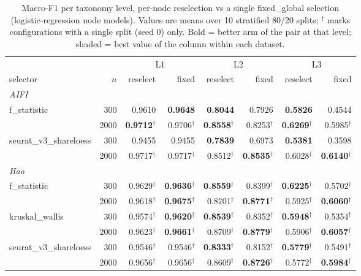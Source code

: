 \begin{table}[t]
\centering
\small
\setlength{\tabcolsep}{4pt}
\begin{tabular}{lrrrrrrr}
\toprule
 & & \multicolumn{2}{c}{L1} & \multicolumn{2}{c}{L2} & \multicolumn{2}{c}{L3} \\
\cmidrule(lr){3-4}\cmidrule(lr){5-6}\cmidrule(lr){7-8}
selector & $n$ & reselect & fixed & reselect & fixed & reselect & fixed \\
\midrule
\multicolumn{8}{l}{\textit{AIFI}} \\
f\_statistic & 300 & 0.9610 & \textbf{0.9648} & \textbf{0.8044} & 0.7926 & \textbf{0.5826} & 0.4544 \\
 & 2000 & \textbf{0.9712$^\dagger$} & 0.9706$^\dagger$ & \cellcolor{palegreen}\textbf{0.8558$^\dagger$} & 0.8253$^\dagger$ & \cellcolor{palegreen}\textbf{0.6269$^\dagger$} & 0.5985$^\dagger$ \\
\addlinespace
seurat\_v3\_shareloess & 300 & 0.9455 & 0.9455 & \textbf{0.7839} & 0.6973 & \textbf{0.5381} & 0.3598 \\
 & 2000 & \cellcolor{palegreen}0.9717$^\dagger$ & \cellcolor{palegreen}0.9717$^\dagger$ & 0.8512$^\dagger$ & \cellcolor{palegreen}\textbf{0.8535$^\dagger$} & 0.6028$^\dagger$ & \cellcolor{palegreen}\textbf{0.6140$^\dagger$} \\
\midrule
\multicolumn{8}{l}{\textit{Hao}} \\
f\_statistic & 300 & 0.9629$^\dagger$ & \textbf{0.9636$^\dagger$} & \textbf{0.8559$^\dagger$} & 0.8399$^\dagger$ & \cellcolor{palegreen}\textbf{0.6225$^\dagger$} & 0.5702$^\dagger$ \\
 & 2000 & 0.9618$^\dagger$ & \cellcolor{palegreen}\textbf{0.9675$^\dagger$} & 0.8701$^\dagger$ & \textbf{0.8771$^\dagger$} & 0.5925$^\dagger$ & \cellcolor{palegreen}\textbf{0.6060$^\dagger$} \\
\addlinespace
kruskal\_wallis & 300 & 0.9574$^\dagger$ & \textbf{0.9620$^\dagger$} & \textbf{0.8539$^\dagger$} & 0.8352$^\dagger$ & \textbf{0.5948$^\dagger$} & 0.5354$^\dagger$ \\
 & 2000 & 0.9623$^\dagger$ & \textbf{0.9661$^\dagger$} & \cellcolor{palegreen}0.8709$^\dagger$ & \cellcolor{palegreen}\textbf{0.8779$^\dagger$} & 0.5906$^\dagger$ & \textbf{0.6057$^\dagger$} \\
\addlinespace
seurat\_v3\_shareloess & 300 & 0.9546$^\dagger$ & 0.9546$^\dagger$ & \textbf{0.8333$^\dagger$} & 0.8152$^\dagger$ & \textbf{0.5779$^\dagger$} & 0.5491$^\dagger$ \\
 & 2000 & \cellcolor{palegreen}0.9656$^\dagger$ & 0.9656$^\dagger$ & 0.8609$^\dagger$ & \textbf{0.8726$^\dagger$} & 0.5772$^\dagger$ & \textbf{0.5984$^\dagger$} \\
\bottomrule
\end{tabular}
\caption{Macro-F1 per taxonomy level, per-node reselection vs a single fixed\_global selection (logistic-regression node models). Values are means over 10 stratified 80/20 splits; $^\dagger$ marks configurations with a single split (seed 0) only. Bold = better arm of the pair at that level; shaded = best value of the column within each dataset.}
\label{tab:reselect-vs-fixed-macrof1}
\end{table}
